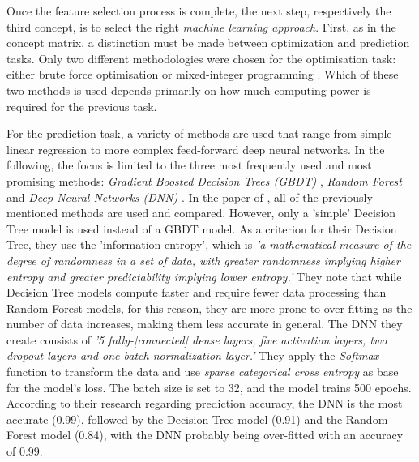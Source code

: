 Once the feature selection process is complete, the next step, respectively the third concept, is to select the right \emph{machine learning approach}. First, as in the concept matrix, a distinction must be made between optimization and prediction tasks. Only two different methodologies were chosen for the optimisation task: either brute force optimisation \parencite{landers_machine_2017} or mixed-integer programming \parencite{becker_analytical_2016,edwards_analyzing_2018, belien_optimization_2017,bonomo_mathematical_2014,matthews_competing_2012}. Which of these two methods is used depends primarily on how much computing power is required for the previous task.

\indent For the prediction task, a variety of methods are used that range from simple linear regression to more complex feed-forward deep neural networks. In the following, the focus is limited to the three most frequently used and most promising methods:  \emph{Gradient Boosted Decision Trees (GBDT)} \parencite{landers_machine_2017,deng_analysis_2020}, \emph{Random Forest} \parencite{deng_analysis_2020,shah_poisson_2021,demediuk_performance_2021,bhateja_analysis_2021} and \emph{Deep Neural Networks (DNN)} \parencite{bhateja_analysis_2021,skinner_method_2015,deng_analysis_2020,lutz_fantasy_2015,landers_machine_2017}. In the paper of \citet{deng_analysis_2020}, all of the previously mentioned methods are used and compared. However, only a 'simple' Decision Tree model is used instead of a GBDT model. As a criterion for their Decision Tree, they use the 'information entropy', which is \emph{'a mathematical measure of the degree of randomness in a set of data, with greater randomness implying higher entropy and greater predictability implying lower entropy.'} \parencite[, p. 4]{deng_analysis_2020} They note that while Decision Tree models compute faster and require fewer data processing than Random Forest models, for this reason, they are more prone to over-fitting as the number of data increases, making them less accurate in general. The DNN they create consists of \emph{'5 fully-[connected] dense layers, five activation layers, two dropout layers and one batch normalization layer.'} \parencite[, p. 4]{deng_analysis_2020} They apply the \emph{Softmax} function to transform the data and use \emph{sparse categorical cross entropy} as base for the model's loss. The batch size is set to 32, and the model trains 500 epochs. According to their research regarding prediction accuracy, the DNN is the most accurate (0.99), followed by the Decision Tree model (0.91) and the Random Forest model (0.84), with the DNN probably being over-fitted with an accuracy of 0.99. \\
